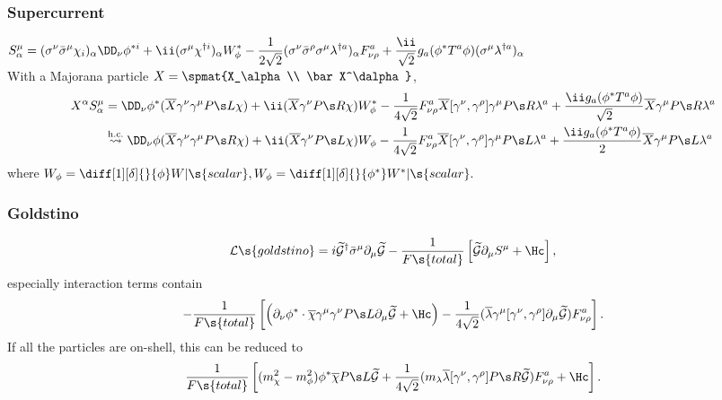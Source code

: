 \subsubsection{Supercurrent}
$\displaystyle S^\mu_\alpha = (\Sn\bSm\chi_i)_\alpha\Dn\phi^{*i} + \ii(\Sm\chi^{\dagger i})_\alpha W_\phi^* -\frac{1}{2\sqrt2}(\Sn\bSr\Sm\lambda^{\dagger a})_\alpha F^a_{\nu\rho}
+\frac{\ii}{\sqrt2}g_a(\phi^*T^a\phi)(\Sm\lambda^{\dagger a})_\alpha$\\
With a Majorana particle $X=\spmat{X_\alpha\\ \bar X^\dalpha}$,\vspace{-10pt}
\begin{align*}
X^\alpha S^\mu_\alpha&=
  \Dn\phi^*(\overline X\Gn\Gm\PL\chi) + \ii(\overline X\Gn\PR\chi)W_\phi^*-\frac{1}{4\sqrt2}F^a_{\nu\rho}\overline X[\Gn,\Gr]\Gm\PR\lambda^a+\frac{\ii g_a(\phi^* T^a\phi)}{\sqrt2}\overline X\Gm\PR\lambda^a\\
&\buildrel{\text{h.c.}}\over\leadsto
 \Dn\phi(\overline X\Gn\Gm\PR\chi) + \ii(\overline X\Gn\PL\chi)W_\phi-\frac{1}{4\sqrt2}F^a_{\nu\rho}\overline X[\Gn,\Gr]\Gm\PL\lambda^a+
\frac{\ii g_a(\phi^* T^a\phi)}{2}\overline X\Gm\PL\lambda^a
 \end{align*}
where $W_\phi=\diff[1][\delta]{}{\phi}W|\s{scalar}, W_\phi=\diff[1][\delta]{}{\phi^*}W^*|\s{scalar}.$

\subsubsection{Goldstino}
\begin{equation}
 \Lag\s{goldstino}=i\goldi^\dagger \bSm\Pm\goldi-\frac{1}{F\s{total}}\left[\goldi\Pm S^\mu+\Hc\right],
\end{equation}
especially interaction terms contain\\
\begin{equation}
-\frac{1}{F\s{total}}
\left[\left(\Pn\phi^*\cdot\overline\chi\Gm\Gn\PL\Pm\goldi+\Hc\right)
-\frac{1}{4\sqrt2}(\overline\lambda\Gm[\Gn,\Gr]\Pm\goldi)F^a_{\nu\rho}\right].
\end{equation}
If all the particles are on-shell, this can be reduced to
\begin{equation}
\frac{1}{F\s{total}}
\left[
(m_\chi^2-m_\phi^2)\phi^*\overline\chi\PL\goldi
+\frac{1}{4\sqrt2}(m_\lambda \overline\lambda[\Gn,\Gr]\PR\goldi)F^a_{\nu\rho}
+\Hc\right].
\end{equation}


